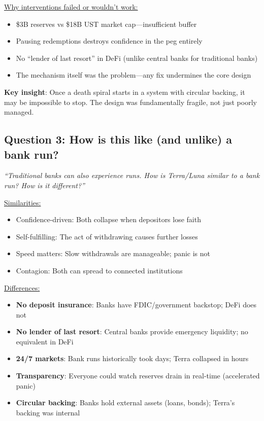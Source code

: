\documentclass[11pt]{article}
\begin{document}
\medskip
\noindent\underline{Why interventions failed or wouldn't work:}
\begin{itemize}[leftmargin=*]
\item \$3B reserves vs \$18B UST market cap---insufficient buffer
\item Pausing redemptions destroys confidence in the peg entirely
\item No ``lender of last resort'' in DeFi (unlike central banks for traditional banks)
\item The mechanism itself was the problem---any fix undermines the core design
\end{itemize}

\medskip
\noindent\textbf{Key insight}: Once a death spiral starts in a system with circular backing, it may be impossible to stop. The design was fundamentally fragile, not just poorly managed.

\subsection*{Question 3: How is this like (and unlike) a bank run?}

\textit{``Traditional banks can also experience runs. How is Terra/Luna similar to a bank run? How is it different?''}

\medskip
\noindent\underline{Similarities:}
\begin{itemize}[leftmargin=*]
\item Confidence-driven: Both collapse when depositors lose faith
\item Self-fulfilling: The act of withdrawing causes further losses
\item Speed matters: Slow withdrawals are manageable; panic is not
\item Contagion: Both can spread to connected institutions
\end{itemize}

\medskip
\noindent\underline{Differences:}
\begin{itemize}[leftmargin=*]
\item \textbf{No deposit insurance}: Banks have FDIC/government backstop; DeFi does not
\item \textbf{No lender of last resort}: Central banks provide emergency liquidity; no equivalent in DeFi
\item \textbf{24/7 markets}: Bank runs historically took days; Terra collapsed in hours
\item \textbf{Transparency}: Everyone could watch reserves drain in real-time (accelerated panic)
\item \textbf{Circular backing}: Banks hold external assets (loans, bonds); Terra's backing was internal
\end{itemize}
\end{document}
